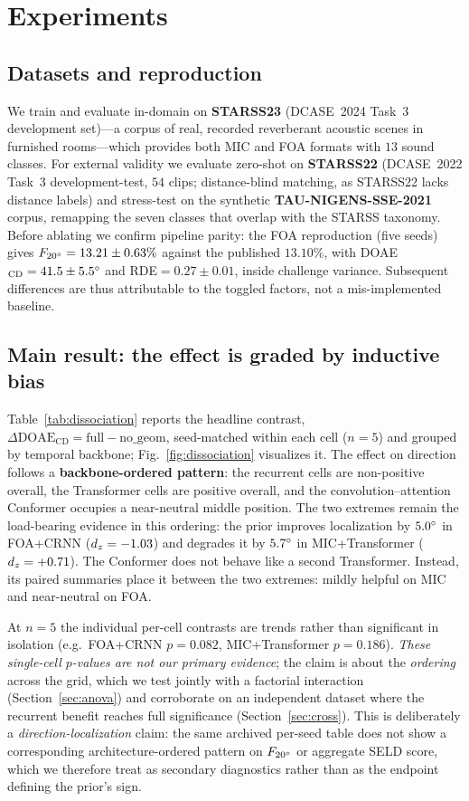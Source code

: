 \section{Experiments}
\label{sec:experiments}

\subsection{Datasets and reproduction}
\label{sec:datasets}
We train and evaluate in-domain on \textbf{STARSS23} (DCASE~2024 Task~3
development set)---a corpus of real, recorded reverberant acoustic scenes in
furnished rooms---which provides both MIC and FOA formats with $13$ sound
classes. For external validity we evaluate zero-shot on \textbf{STARSS22}
(DCASE~2022 Task~3 development-test, $54$ clips; distance-blind matching, as
STARSS22 lacks distance labels) and stress-test on the synthetic
\textbf{TAU-NIGENS-SSE-2021} corpus, remapping the seven classes that overlap
with the STARSS taxonomy. Before ablating we confirm pipeline parity: the FOA
reproduction (five seeds) gives $F_{20^\circ}=13.21\pm0.63\%$ against the
published $13.10\%$, with DOAE$_\mathrm{CD}=41.5\pm5.5^\circ$ and
RDE$=0.27\pm0.01$, inside challenge variance. Subsequent differences are thus
attributable to the toggled factors, not a mis-implemented baseline.
\label{sec:repro}

\subsection{Main result: the effect is graded by inductive bias}
\label{sec:main}
Table~\ref{tab:dissociation} reports the headline contrast,
$\Delta\text{DOAE}_\mathrm{CD}=\text{full}-\text{no\_geom}$, seed-matched within
each cell ($n=5$) and grouped by temporal backbone; Fig.~\ref{fig:dissociation}
visualizes it. The effect on direction follows a \textbf{backbone-ordered
pattern}: the recurrent cells are non-positive overall, the Transformer cells
are positive overall, and the convolution--attention Conformer occupies a
near-neutral middle position. The two extremes remain the load-bearing evidence
in this ordering: the prior improves localization by $5.0^\circ$ in FOA+CRNN
($d_z=-1.03$) and degrades it by $5.7^\circ$ in MIC+Transformer
($d_z=+0.71$). The Conformer does not behave like a second Transformer. Instead,
its paired summaries place it between the two extremes: mildly helpful on MIC
and near-neutral on FOA.

At $n=5$ the individual per-cell contrasts are trends rather than significant in
isolation (e.g.\ FOA+CRNN $p=0.082$, MIC+Transformer $p=0.186$). \emph{These
single-cell $p$-values are not our primary evidence}; the claim is about the
\emph{ordering} across the grid, which we test jointly with a factorial
interaction (Section~\ref{sec:anova}) and corroborate on an independent dataset
where the recurrent benefit reaches full significance
(Section~\ref{sec:cross}).
This is deliberately a \emph{direction-localization} claim: the same archived
per-seed table does not show a corresponding architecture-ordered pattern on
$F_{20^\circ}$ or aggregate SELD score, which we therefore treat as secondary
diagnostics rather than as the endpoint defining the prior's sign.

